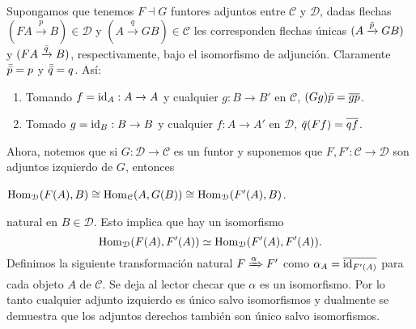 \documentclass{comunicaciones}
\begin{document}
\begin{obs}\label{adjcomp}
	Supongamos que tenemos $F\dashv G$ funtores adjuntos entre $\mathcal{C}$ y $\mathcal{D}$, dadas flechas $(FA\xrightarrow p B)\in\mathcal{D}$ y $(A\xrightarrow q GB)\in\mathcal{C}$ les corresponden flechas únicas $(A\xrightarrow{\Bar{p}}GB)$	y $(FA\xrightarrow{\Bar{q}}B)$,
	respectivamente, bajo el isomorfismo de adjunción. Claramente $\Bar{\Bar{p}}=p$ y $\Bar{\Bar{q}}=q$. As\'i:
	\begin{enumerate}
		\item
		Tomando $f=\mathrm{id}_A:A\to A$ y cualquier $g:B\to B'$ en $\mathcal{C}$, $(Gg)\bar p=\overline{gp}$.
		\item
		Tomado $g=\mathrm{id}_B:B\to B$ y cualquier $f:A\to A'$ en $\mathcal{D}$, $\bar q(Ff)=\overline{qf}$.
	\end{enumerate}
\end{obs}

Ahora, notemos que si $G: \mathcal{D} \longrightarrow  \mathcal{C}$ es un funtor y suponemos que  $F,F': \mathcal{C} \longrightarrow  \mathcal{D}$ son adjuntos izquierdo de $G$, entonces 
\begin{center}
	$\mathrm{Hom}_\mathcal{D}(F(A),B)\cong \mathrm{Hom}_\mathcal{C}(A,G(B)) \cong \mathrm{Hom}_\mathcal{D}(F'(A),B)$.
\end{center}
natural en $B \in \mathcal{D}$. Esto implica que hay un isomorfismo 
\[\mathrm{Hom}_\mathcal{D}(F(A),F'(A))\simeq \mathrm{Hom}_\mathcal{D}(F'(A),F'(A)).\]
Definimos la siguiente transformaci\'on natural $F\xRightarrow{\alpha}F'$ como $\alpha_A=\overline{\mathrm{id}_{F'(A)}}$ para cada objeto $A$ de $\mathcal{C}$. Se deja al lector checar que $\alpha$ es un isomorfismo. Por lo tanto cualquier adjunto izquierdo es único salvo isomorfismos y dualmente se demuestra que los adjuntos derechos también son único salvo isomorfismos.
\end{document}
